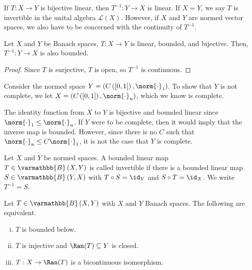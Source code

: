 \documentclass[10pt]{mypackage}
\renewcommand*{\mathbb}[1]{\varmathbb{#1}}
\newcommand{\B}{\mathbb{B}}
\begin{document}
  If $T: X\rightarrow Y$ is bijective linear, then $T^{-1}:Y\rightarrow X$ is linear. If $X = Y$, we say $T$ is invertible in the unital algebra $\mathcal{L}\left(X\right)$. However, if $X$ and $Y$ are normed vector spaces, we also have to be concerned with the continuity of $T^{-1}$.
  \begin{corollary}
    Let $X$ and $Y$ be Banach spaces, $T: X\rightarrow Y$ is linear, bounded, and bijective. Then, $T^{-1}: Y\rightarrow X$ is also bounded.
  \end{corollary}
  \begin{proof}
    Since $T$ is surjective, $T$ is open, so $T^{-1}$ is continuous.
  \end{proof}
  \begin{example}
    Consider the normed space $Y = \left(C\left([0,1]\right),\norm{\cdot}_1\right)$. To show that $Y$ is not complete, we let $X = \left(C\left([0,1]\right),\norm{\cdot}_{u}\right)$, which we know is complete.\newline

    The identity function from $X$ to $Y$ is bijective and bounded linear since $\norm{\cdot}_{1}\leq \norm{\cdot}_u$. If $Y$ were to be complete, then it would imply that the inverse map is bounded. However, since there is no $C$ such that $\norm{\cdot}_u\leq C\norm{\cdot}_1$, it is not the case that $Y$ is complete.
  \end{example}
  \begin{definition}
    Let $X$ and $Y$ be normed spaces. A bounded linear map $T\in \B\left(X,Y\right)$ is called invertible if there is a bounded linear map $S\in \B\left(Y,X\right)$ with $T\circ S = \id_Y$ and $S\circ T = \id_X$. We write $T^{-1} = S$.
  \end{definition}
  \begin{corollary}
    Let $T\in \B\left(X,Y\right)$ with $X$ and $Y$ Banach spaces. The following are equivalent.
    \begin{enumerate}[(i)]
      \item $T$ is bounded below.
      \item $T$ is injective and $\Ran(T)\subseteq Y$ is closed.
      \item $T: X\rightarrow \Ran(T)$ is a bicontinuous isomorphism.
    \end{enumerate}
  \end{corollary}
\end{document}
